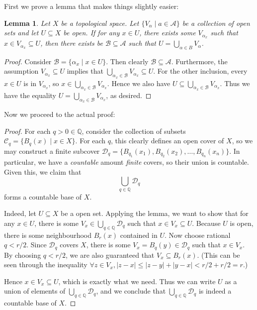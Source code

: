 \documentclass[12pt]{article}
\newtheorem*{lemma}{Lemma}
\theoremstyle{remark}
\theoremstyle{named}
\begin{document}
First we prove a lemma that makes things slightly easier:
\begin{lemma}
    Let \(X\) be a topological space. Let \(\{V_\alpha \mid a \in \mathcal A\}\) be a collection of open sets and let \(U \subseteq X\) be open. If for any \(x \in U\), there exists some \(V_{\alpha_x}\) such that \(x \in V_{\alpha_x} \subseteq U\), then there exists be \(\mathcal B \subseteq \mathcal A\) such that \(U = \bigcup_{\alpha \in B} V_\alpha\).
\end{lemma}

\begin{proof}
    Consider \(\mathcal B = \{\alpha_x \mid x \in U\}\). Then clearly \(\mathcal B \subseteq \mathcal A\). Furthermore, the assumption \(V_{\alpha_x} \subseteq U\) implies that \(\bigcup_{\alpha_x \in \mathcal B} V_{\alpha_x} \subseteq U\). 
    For the other inclusion, every \(x \in U\) is in \(V_{\alpha_x}\), so \(x \in \bigcup_{\alpha_x \in \mathcal B} V_{\alpha_x}\). Hence we also have \(U \subseteq \bigcup_{\alpha_x \in \mathcal B} V_{\alpha_x}\). Thus we have the equality \(U = \bigcup_{\alpha_x \in \mathcal B} V_{\alpha_x}\), as desired.
\end{proof}

Now we proceed to the actual proof:

\begin{proof}
    For each \(q > 0 \in \mathbb Q\), consider the collection of subsets \(\mathcal C_q = \{B_q(x) \mid x \in X\}\). For each \(q\), this clearly defines an open cover of \(X\), so we may construct a finite subcover \(\mathcal D_q = \{B_{q_1}(x_1), B_{q_2}(x_2), \dots, B_{q_n}(x_n)\}\). In particular, we have a \textit{countable} amount \textit{finite} covers, so their union is countable. Given this, we claim that 
    \[\bigcup_{q \in \mathbb Q} \mathcal D_q\]
    forms a countable base of \(X\). 

    Indeed, let \(U \subseteq X\) be a open set. Applying the lemma, we want to show that for any \(x \in U\), there is some \(V_x \in \bigcup_{q \in \mathbb Q} \mathcal D_q\) such that \(x \in V_x \subseteq U\). Because \(U\) is open, there is some neighbourhood \(B_r(x)\) contained in \(U\). Now choose rational \(q < r / 2\). 
    Since \(\mathcal D_q\) covers \(X\), there is some \(V_x = B_q(y) \in \mathcal D_q\) such that \(x \in V_x\). By choosing \(q < r / 2\), we are also guaranteed that \(V_x \subseteq B_r(x)\). (This can be seen through the inequality \(\forall z \in V_x, |z - x| \le |z - y| + |y - x| < r/2 + r/2 = r\).)

    Hence \(x \in V_x \subseteq U\), which is exactly what we need. Thus we can write \(U\) as a union of elements of \(\bigcup_{q \in \mathbb Q} \mathcal D_q\), and we conclude that \(\bigcup_{q \in \mathbb Q} \mathcal D_q\) is indeed a countable base of \(X\).
\end{proof}
\end{document}
